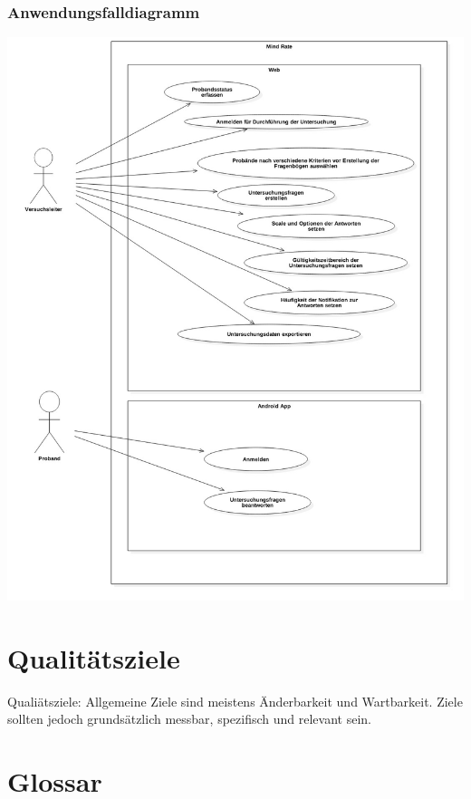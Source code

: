 \documentclass[a4paper]{scrreprt}
\begin{document}
            \newpage
            \subsection{Anwendungsfalldiagramm}
                \vspace{0.4cm}
                \begin{center}
                    \includegraphics[scale = 0.4]{UseCaseDiagram1.jpg}
                \end{center}

        \newpage

    \chapter{Qualitätsziele}
        Qualiätsziele: Allgemeine Ziele sind meistens Änderbarkeit und Wartbarkeit.
        Ziele sollten jedoch grundsätzlich messbar, spezifisch und relevant sein.

    \chapter{Glossar}

    \listoffigures
\end{document}
